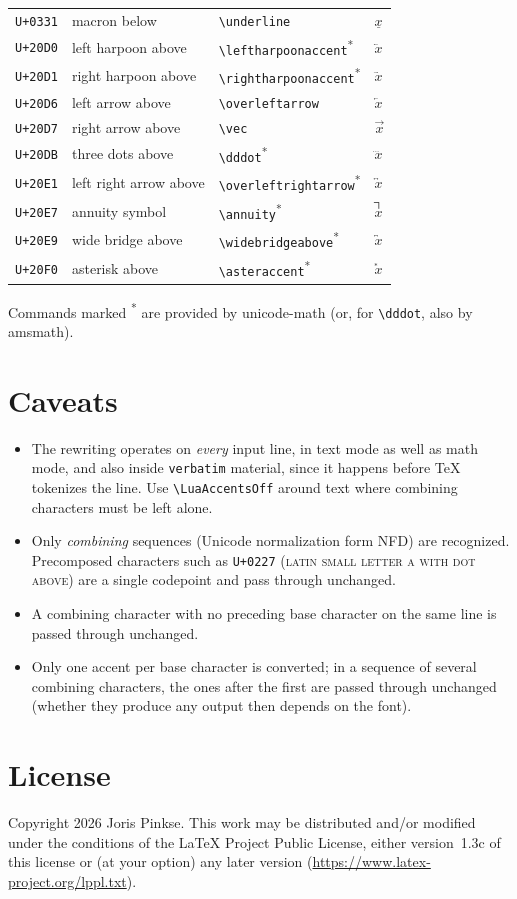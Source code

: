 \documentclass{article}
\begin{document}
\begin{longtable}{llll}
\texttt{U+0331} & macron below & \verb|\underline| & $\underline{x}$\\
\texttt{U+20D0} & left harpoon above & \verb|\leftharpoonaccent|\textsuperscript{*} & $\leftharpoonaccent{x}$\\
\texttt{U+20D1} & right harpoon above & \verb|\rightharpoonaccent|\textsuperscript{*} & $\rightharpoonaccent{x}$\\
\texttt{U+20D6} & left arrow above & \verb|\overleftarrow| & $\overleftarrow{x}$\\
\texttt{U+20D7} & right arrow above & \verb|\vec| & $\vec{x}$\\
\texttt{U+20DB} & three dots above & \verb|\dddot|\textsuperscript{*} & $\dddot{x}$\\
\texttt{U+20E1} & left right arrow above & \verb|\overleftrightarrow|\textsuperscript{*} & $\overleftrightarrow{x}$\\
\texttt{U+20E7} & annuity symbol & \verb|\annuity|\textsuperscript{*} & $\annuity{x}$\\
\texttt{U+20E9} & wide bridge above & \verb|\widebridgeabove|\textsuperscript{*} & $\widebridgeabove{x}$\\
\texttt{U+20F0} & asterisk above & \verb|\asteraccent|\textsuperscript{*} & $\asteraccent{x}$\\
\bottomrule
\end{longtable}

\noindent
Commands marked \textsuperscript{*} are provided by
\textsf{unicode-math} (or, for \verb|\dddot|, also by
\textsf{amsmath}).

\section{Caveats}

\begin{itemize}
  \item The rewriting operates on \emph{every} input line, in text
    mode as well as math mode, and also inside \texttt{verbatim}
    material, since it happens before TeX tokenizes the line.  Use
    \verb|\LuaAccentsOff| around text where combining characters must
    be left alone.
  \item Only \emph{combining} sequences (Unicode normalization form
    NFD) are recognized.  Precomposed characters such as
    \texttt{U+0227} (\textsc{latin small letter a with dot above}) are
    a single codepoint and pass through unchanged.
  \item A combining character with no preceding base character on the
    same line is passed through unchanged.
  \item Only one accent per base character is converted; in a sequence
    of several combining characters, the ones after the first are
    passed through unchanged (whether they produce any output then
    depends on the font).
\end{itemize}

\section{License}

Copyright 2026 Joris Pinkse.  This work may be distributed and/or
modified under the conditions of the \LaTeX{} Project Public License,
either version~1.3c of this license or (at your option) any later
version (\url{https://www.latex-project.org/lppl.txt}).
\end{document}
